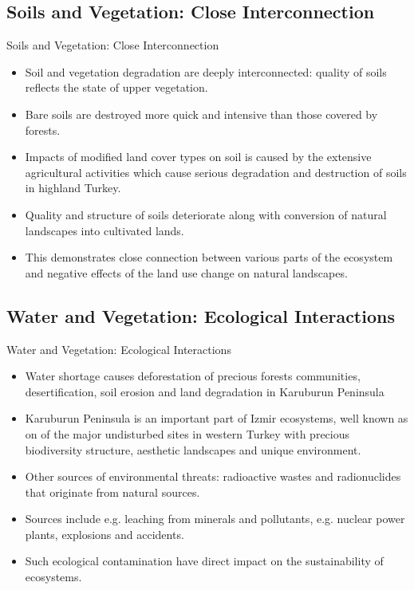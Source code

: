 \documentclass[pdflatex,compress,9pt,
	xcolor={dvipsnames,dvipsnames,svgnames,x11names,table},
	hyperref={colorlinks = true,breaklinks = true, urlcolor = NavyBlue, breaklinks = true}]{beamer}
\begin{document}
\subsection{Soils and Vegetation: Close Interconnection}
\begin{frame}{Soils and Vegetation: Close Interconnection}
\begin{itemize}
            \item Soil and vegetation degradation are deeply interconnected: quality of soils reflects the state of upper vegetation.
            \item Bare soils are destroyed more quick and intensive than those covered by forests.
            \item Impacts of modified land cover types on soil is caused by the extensive agricultural activities which cause serious degradation and destruction of soils in highland Turkey. 
            \item Quality and structure of soils deteriorate along with conversion of natural landscapes into cultivated lands. 
            \item This demonstrates close connection between various parts of the ecosystem and negative effects of the land use change on natural landscapes.
\end{itemize}
\end{frame}

\subsection{Water and Vegetation: Ecological Interactions}
\begin{frame}{Water and Vegetation: Ecological Interactions}
\begin{itemize}
            \item Water shortage causes deforestation of precious forests communities, desertification, soil erosion and land degradation in Karuburun Peninsula
            \item Karuburun Peninsula is an important part of Izmir ecosystems, well known as on of the major undisturbed sites in western Turkey with precious biodiversity structure, aesthetic landscapes and unique environment.
            \item Other sources of environmental threats: radioactive wastes and radionuclides that originate from natural sources.
            \item Sources include e.g. leaching from minerals and pollutants, e.g. nuclear power plants, explosions and accidents.
            \item Such ecological contamination have direct impact on the sustainability of ecosystems.
\end{itemize}
\end{frame}
\end{document}
